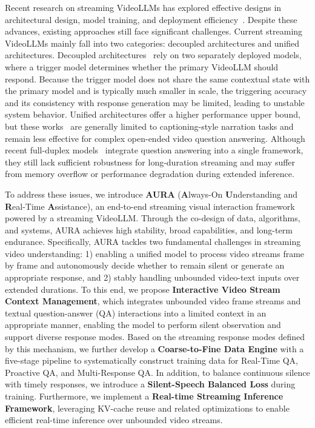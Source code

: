 Recent research on streaming VideoLLMs has explored effective designs in architectural design, model training, and deployment efficiency~\citep{chen2024videollm,xu2025streamingvlm,qian2025dispider,wang2025mmduet2}. Despite these advances, existing approaches still face significant challenges. Current streaming VideoLLMs mainly fall into two categories: decoupled architectures and unified architectures. Decoupled architectures~\citep{qian2025dispider, wang2025streambridge} rely on two separately deployed models, where a trigger model determines whether the primary VideoLLM should respond. Because the trigger model does not share the same contextual state with the primary model and is typically much smaller in scale, the triggering accuracy and its consistency with response generation may be limited, leading to unstable system behavior. Unified architectures offer a higher performance upper bound, but these works~\citep{chen2024videollm,xu2025streamingvlm} are generally limited to captioning-style narration tasks and remain less effective for complex open-ended video question answering. Although recent full-duplex models~\citep{minicpmo45} integrate question answering into a single framework, they still lack sufficient robustness for long-duration streaming and may suffer from memory overflow or performance degradation during extended inference.

To address these issues, we introduce \textbf{AURA} (\textbf{A}lways-On \textbf{U}nderstanding and \textbf{R}eal-Time \textbf{A}ssistance), an end-to-end streaming visual interaction framework powered by a streaming VideoLLM. Through the co-design of data, algorithms, and systems, AURA achieves high stability, broad capabilities, and long-term endurance. Specifically, AURA tackles two fundamental challenges in streaming video understanding: 1) enabling a unified model to process video streams frame by frame and autonomously decide whether to remain silent or generate an appropriate response, and 2) stably handling unbounded video-text inputs over extended durations. To this end, we propose \textbf{Interactive Video Stream Context Management}, which integrates unbounded video frame streams and textual question-answer (QA) interactions into a limited context in an appropriate manner, enabling the model to perform silent observation and support diverse response modes. Based on the streaming response modes defined by this mechanism, we further develop a \textbf{Coarse-to-Fine Data Engine} with a five-stage pipeline to systematically construct training data for Real-Time QA, Proactive QA, and Multi-Response QA. In addition, to balance continuous silence with timely responses, we introduce a \textbf{Silent-Speech Balanced Loss} during training. Furthermore, we implement a \textbf{Real-time Streaming Inference Framework}, leveraging KV-cache reuse and related optimizations to enable efficient real-time inference over unbounded video streams.

